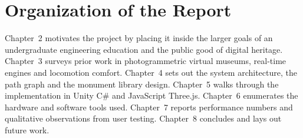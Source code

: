 \section{Organization of the Report}

Chapter~2 motivates the project by placing it inside the larger goals of an undergraduate engineering education and the public good of digital heritage. Chapter~3 surveys prior work in photogrammetric virtual museums, real-time engines and locomotion comfort. Chapter~4 sets out the system architecture, the path graph and the monument library design. Chapter~5 walks through the implementation in Unity C\# and JavaScript Three.js. Chapter~6 enumerates the hardware and software tools used. Chapter~7 reports performance numbers and qualitative observations from user testing. Chapter~8 concludes and lays out future work.
